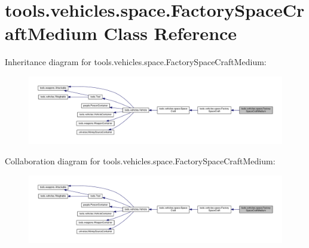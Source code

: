 \hypertarget{classtools_1_1vehicles_1_1space_1_1_factory_space_craft_medium}{}\section{tools.\+vehicles.\+space.\+Factory\+Space\+Craft\+Medium Class Reference}
\label{classtools_1_1vehicles_1_1space_1_1_factory_space_craft_medium}


Inheritance diagram for tools.\+vehicles.\+space.\+Factory\+Space\+Craft\+Medium\+:
\nopagebreak
\begin{figure}[H]
\begin{center}
\leavevmode
\includegraphics[width=350pt]{classtools_1_1vehicles_1_1space_1_1_factory_space_craft_medium__inherit__graph}
\end{center}
\end{figure}


Collaboration diagram for tools.\+vehicles.\+space.\+Factory\+Space\+Craft\+Medium\+:
\nopagebreak
\begin{figure}[H]
\begin{center}
\leavevmode
\includegraphics[width=350pt]{classtools_1_1vehicles_1_1space_1_1_factory_space_craft_medium__coll__graph}
\end{center}
\end{figure}
